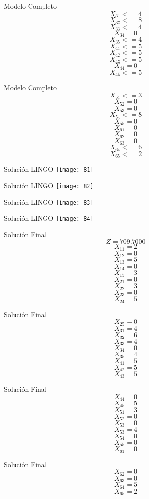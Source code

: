 \documentclass{beamer}
\begin{document}
\begin{frame}[fragile]{Modelo Completo}
\[X_{31} <= 4 \]
\[X_{32} <= 8\]
\[X_{33} <= 4\]
\[X_{34}  = 0\]
\[X_{35} <= 4\]
\[X_{41} <= 5 \]
\[X_{42} <= 5\]
\[X_{43} <= 5\]
\[X_{44} = 0\]
\[X_{45} <= 5\]
\end{frame}
\begin{frame}[fragile]{Modelo Completo}
\[X_{51} <= 3 \]
\[X_{52} = 0\]
\[X_{53} = 0\]
\[X_{54}  <=  8\]
\[X_{55} = 0\]
\[X_{61} = 0 \]
\[X_{62} = 0\]
\[X_{63} = 0\]
\[X_{64}  <=  6\]
\[X_{65} <= 2\]
\end{frame}

\begin{frame}[fragile]{Soluci\'on LINGO}
    \texttt{[image: 81]}
\end{frame}
\begin{frame}[fragile]{Soluci\'on LINGO}
    \texttt{[image: 82]}
\end{frame}
\begin{frame}[fragile]{Soluci\'on LINGO}
    \texttt{[image: 83]}
\end{frame}
\begin{frame}[fragile]{Soluci\'on LINGO}
    \texttt{[image: 84]}
\end{frame}

\begin{frame}[fragile]{Soluci\'on Final}
\[Z = 709.7000 \]
\[X_{11} = 2\]
\[X_{12} = 0\]
\[X_{13} = 5\]
\[X_{14} = 0\]
\[X_{15} = 3\]
\[X_{21} = 0\]
\[X_{22} = 3\]
\[X_{23} = 0\]
\[X_{24} = 5\]
\end{frame}
\begin{frame}[fragile]{Soluci\'on Final}
\[X_{25} = 0\]
\[X_{31} = 4\]
\[X_{32} = 6\]
\[X_{33} = 4\]
\[X_{34} = 0\]
\[X_{35} = 4\]
\[X_{41} = 5\]
\[X_{42} = 5\]
\[X_{43} = 5\]
\end{frame}
\begin{frame}[fragile]{Soluci\'on Final}
\[X_{44} = 0\]
\[X_{45} = 5\]
\[X_{51} = 3\]
\[X_{52} = 0\]
\[X_{53} = 0\]
\[X_{53} = 4\]
\[X_{54} = 0\]
\[X_{55} = 0\]
\[X_{61} = 0\]
\end{frame}
\begin{frame}[fragile]{Soluci\'on Final}
\[X_{62} = 0\]
\[X_{63} = 0\]
\[X_{64} = 5\]
\[X_{65} = 2\]
\end{frame}
\end{document}
